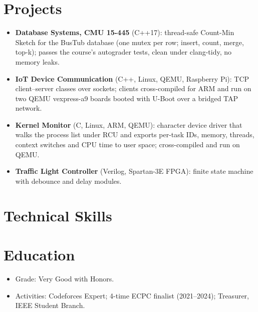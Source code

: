 \documentclass[10pt]{article}
\begin{document}
\section*{Projects}
\begin{itemize}
  \item \textbf{Database Systems, CMU 15-445} (C++17): thread-safe Count-Min Sketch for the BusTub database (one mutex per row; insert, count, merge, top-k); passes the course's autograder tests, clean under clang-tidy, no memory leaks. 
  \item \textbf{IoT Device Communication} (C++, Linux, QEMU, Raspberry Pi): TCP client--server classes over sockets; clients cross-compiled for ARM and run on two QEMU vexpress-a9 boards booted with U-Boot over a bridged TAP network. 
  \item \textbf{Kernel Monitor} (C, Linux, ARM, QEMU): character device driver that walks the process list under RCU and exports per-task IDs, memory, threads, context switches and CPU time to user space; cross-compiled and run on QEMU. 
  \item \textbf{Traffic Light Controller} (Verilog, Spartan-3E FPGA): finite state machine with debounce and delay modules. 
\end{itemize}

\section*{Technical Skills}

\section*{Education}
\begin{itemize}
  \item Grade: Very Good with Honors.
  \item Activities: Codeforces Expert; 4-time ECPC finalist (2021--2024); Treasurer, IEEE Student Branch.
\end{itemize}
\end{document}

